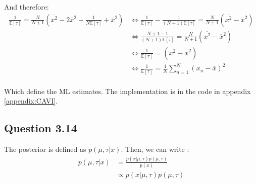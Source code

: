 \documentclass{article}
\begin{document}
And therefore:
\begin{equation}
    \begin{split}
        \frac{1}{\mathbb{E}[\tau]} = \frac{N}{N+1}\left(\overline{x^2} - 2\overline{x}^2 + \frac{1}{N\mathbb{E}[\tau]} + \overline{x}^2\right) & \Leftrightarrow \frac{1}{\mathbb{E}[\tau]} - \frac{1}{(N+1)\mathbb{E}[\tau]} = \frac{N}{N+1}\left(\overline{x^2} - \overline{x}^2\right) \\
                                                                                                                                               & \Leftrightarrow \frac{N+1-1}{(N+1)\mathbb{E}[\tau]} = \frac{N}{N+1}\left(\overline{x^2} - \overline{x}^2\right)                          \\
                                                                                                                                               & \Leftrightarrow \frac{1}{\mathbb{E}[\tau]} = \left(\overline{x^2} - \overline{x}^2\right)                                                \\
                                                                                                                                               & \Leftrightarrow \frac{1}{\mathbb{E}[\tau]} = \frac{1}{N}\sum_{n=1}^{N}(x_n - \overline{x})^2                                             \\
    \end{split}
\end{equation}

Which define the ML estimates. The implementation is in the code in appendix \ref{appendix:CAVI}.

\subsection*{Question 3.14}

The posterior is defined as $p(\mu, \tau|x)$. Then, we can write :
\begin{equation}
    \begin{split}
        p(\mu, \tau|x) & = \frac{p(x|\mu, \tau)p(\mu, \tau)}{p(x)} \\
                       & \propto p(x|\mu, \tau)p(\mu, \tau)
    \end{split}
\end{equation}
\end{document}
